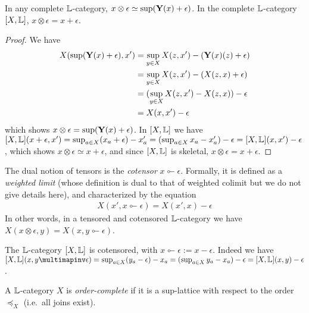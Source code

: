 \begin{lemma}
In any complete $\mathbb{L}$-category, $x\otimes \epsilon \simeq \sup(  \mathbf{Y}(x)+\epsilon  )$.
In the complete $\mathbb{L}$-category $[X,\mathbb{L}]$, $x\otimes \epsilon= x+\epsilon$.
\end{lemma}
\begin{proof}
We have 
\begin{align*}
X(\sup(\mathbf{Y}(x)+\epsilon), x')& =\sup_{y\in X}X(z,x')- (\mathbf{Y}(x)(z)+\epsilon)\\
&= \sup_{y\in X}X(z,x')-(X(z,x)+\epsilon)\\
&= (\sup_{y\in X}X(z,x')-X(z,x))-\epsilon\\
&= X(x,x')-\epsilon
\end{align*}
which shows $x\otimes \epsilon=\sup(\mathbf{Y}(x)+\epsilon)$. In $[X,\mathbb{L}]$ we have 
$[X,\mathbb{L}](x+\epsilon, x')=\sup_{a\in X}(x_{a}+\epsilon)-x'_{a}= (\sup_{a\in X}x_{a}-x'_{a})-\epsilon= [X,\mathbb{L}](x, x')-\epsilon$, which shows $x\otimes \epsilon \simeq x+\epsilon$, and since $[X,\mathbb{L}]$ is skeletal, $x\otimes \epsilon=x+\epsilon$.
\end{proof}


The dual notion of tensors is the \emph{cotensor} $x\multimapinv \epsilon$. Formally, it is defined as a \emph{weighted limit} (whose definition is dual to that of weighted colimit but we do not give details here), and characterized by the equation
\begin{align*}
X(x', x\multimapinv \epsilon)= X(x',x)-\epsilon
\end{align*}
In other words, in a tensored and cotensored $\mathbb{L}$-category we have $X(x\otimes \epsilon,y)= X(x,y\multimapinv \epsilon)$. 

\begin{example}
The $\mathbb{L}$-category $[X,\mathbb{L}]$ is cotensored, with $x\multimapinv \epsilon:= x-\epsilon$. Indeed we have $[X,\Lawv](x,  y\multimapinv \epsilon)=\sup_{a\in X}( y_{a}-\epsilon)-x_{a}=(\sup_{a\in X} y_{a}-x_{a})-\epsilon= [X,\Lawv](x,  y)-\epsilon$.
\end{example}

\begin{definition}
A $\mathbb{L}$-category $X$ is \emph{order-complete} if it is a sup-lattice with respect to the order $\preceq_{X}$ (i.e.~all joins exist).
\end{definition}


